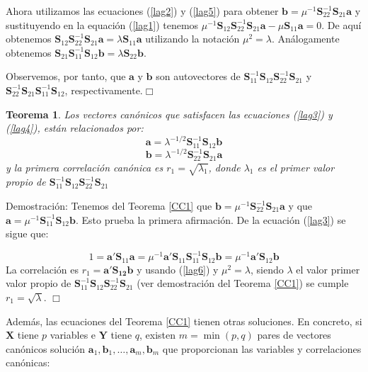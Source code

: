 \documentclass[tfg,cienciasbased,lot,lof,covers,final,overleaf,nocopyright]{tfgtfmthesisuam}
\newtheorem{teor}{Teorema}[chapter]
\begin{document}
Ahora utilizamos las ecuaciones (\ref{lag2}) y (\ref{lag5}) para obtener $\mathbf{b} = \mu^{-1} \mathbf{S}_{22}^{-1}\mathbf{S}_{21}\mathbf{a}$ y sustituyendo en la equación (\ref{lag1}) tenemos $\mu^{-1} \mathbf{S}_{12}\mathbf{S}_{22}^{-1}\mathbf{S}_{21}\mathbf{a} - \mu \mathbf{S}_{11}\mathbf{a} = 0$. De aquí obtenemos $\mathbf{S}_{12}\mathbf{S}_{22}^{-1}\mathbf{S}_{21}\mathbf{a} = \lambda \mathbf{S}_{11}\mathbf{a}$ utilizando la notación $\mu^2 = \lambda$. Análogamente obtenemos $\mathbf{S}_{21}\mathbf{S}_{11}^{-1}\mathbf{S}_{12}\mathbf{b} = \lambda \mathbf{S}_{22}\mathbf{b}$.

Observemos, por tanto, que $\mathbf{a}$ y $\mathbf{b}$ son autovectores de $\mathbf{S}_{11}^{-1} \mathbf{S}_{12} \mathbf{S}_{22}^{-1} \mathbf{S}_{21}$ y $\mathbf{S}_{22}^{-1} \mathbf{S}_{21} \mathbf{S}_{11}^{-1} \mathbf{S}_{12}$, respectivamente.\hfill$\Box$

\begin{teor}
    Los vectores canónicos que satisfacen las ecuaciones (\ref{lag3}) y (\ref{lag4}), están relacionados por:\\ 
    $$ \mathbf{a} = \lambda^{-1/2} \mathbf{S}_{11}^{-1} \mathbf{S}_{12} \mathbf{b}$$
    $$ \mathbf{b} = \lambda^{-1/2} \mathbf{S}_{22}^{-1} \mathbf{S}_{21} \mathbf{a}$$
    y la primera correlación canónica es $r_1 = \sqrt{\lambda_1}$, donde $\lambda_1$ es el primer valor propio de $\mathbf{S}_{11}^{-1} \mathbf{S}_{12} \mathbf{S}_{22}^{-1} \mathbf{S}_{21}$
\end{teor}
Demostración:
Tenemos del Teorema \ref{CC1} que $\mathbf{b} = \mu^{-1} \mathbf{S}_{22}^{-1}\mathbf{S}_{21}\mathbf{a}$ y que $\mathbf{a} = \mu^{-1} \mathbf{S}_{11}^{-1}\mathbf{S}_{12}\mathbf{b}$. Esto prueba la primera afirmación. De la ecuación (\ref{lag3}) se sigue que:

\begin{equation}[lag6]{}
    1 = \mathbf{a'S}_{11}\mathbf{a} = \mu^{-1}  \mathbf{a'S}_{11}\mathbf{S}_{11}^{-1}\mathbf{S}_{12}\mathbf{b} = \mu^{-1} \mathbf{a'S}_{12}\mathbf{b}
\end{equation}
La correlación es $r_1 = \mathbf{a'S_{12}b}$ y usando (\ref{lag6}) y $\mu^2 = \lambda$, siendo $\lambda$ el valor primer valor propio de $\mathbf{S}_{11}^{-1} \mathbf{S}_{12} \mathbf{S}_{22}^{-1} \mathbf{S}_{21}$ (ver demostración del Teorema \ref{CC1}) se cumple $r_1 = \sqrt{\lambda}$. \hfill $\Box$

Además, las ecuaciones del Teorema \ref{CC1} tienen otras soluciones. En concreto, si $\mathbf{X}$ tiene $p$ variables e $\mathbf{Y}$ tiene $q$, existen $m = \min (p,q)$ pares de vectores canónicos solución $\mathbf{a}_1, \mathbf{b}_1, \ldots, \mathbf{a}_m, \mathbf{b}_m$ que proporcionan las variables y correlaciones canónicas:
\end{document}
